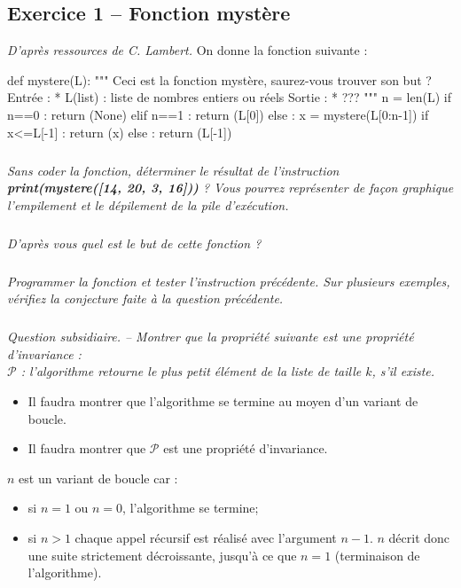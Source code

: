 \documentclass[10pt,fleqn]{article} %
\begin{document}

\vspace{8cm}
\pagestyle{fancy}
\thispagestyle{plain}


\def\columnseprulecolor{\color{ocre}}
\setlength{\columnseprule}{0.4pt} 
\ifprof
\else
\begin{multicols}{2}
\fi

\subsection*{Exercice 1 -- Fonction mystère}
\textit{D'après ressources de C. Lambert.}
On donne la fonction suivante : 
\begin{py}
\begin{python}
def mystere(L):
    """
    Ceci est la fonction mystère, saurez-vous 
    trouver son but ?
    Entrée : 
        * L(list) : liste de nombres entiers
    ou réels
    Sortie : 
        * ??? 
    """
    n = len(L)
    if n==0 :
        return (None)
    elif n==1 :
        return (L[0])
    else :
        x = mystere(L[0:n-1])
        if x<=L[-1] :
            return (x)
        else : 
            return (L[-1])
\end{python}
\end{py}

\subparagraph{}
\textit{Sans coder la fonction, déterminer le résultat de l'instruction \textbf{print(mystere([14, 20, 3, 16]))} ? Vous pourrez représenter de façon graphique l'empilement et le dépilement de la pile d'exécution.}

\subparagraph{}
\textit{D'après vous quel est le but de cette fonction ?}

\subparagraph{}
\textit{Programmer la fonction et tester l'instruction précédente. Sur plusieurs exemples, vérifiez la conjecture faite à la question précédente.}


\subparagraph{}
\textit{Question subsidiaire. -- Montrer que la propriété suivante est une propriété d'invariance :\\
$\mathcal{P}$ : l'algorithme retourne le plus petit élément de la liste de taille $k$, s'il existe.}

\begin{rem}
\begin{itemize}
\item Il faudra montrer que l'algorithme se termine au moyen d'un variant de boucle. 
\item Il faudra montrer que $\mathcal{P}$ est une propriété d'invariance. 
\end{itemize}
\end{rem}
\ifprof
\begin{corrige}
$n$ est un variant de boucle car : 
\begin{itemize}
\item si $n=1$ ou $n=0$, l'algorithme se termine;
\item si $n>1$ chaque appel récursif est réalisé avec l'argument $n-1$. $n$ décrit donc une suite strictement décroissante, jusqu'à ce que $n=1$ (terminaison de l'algorithme). 
\end{itemize}


\end{corrige}
\end{multicols}
\end{document}
